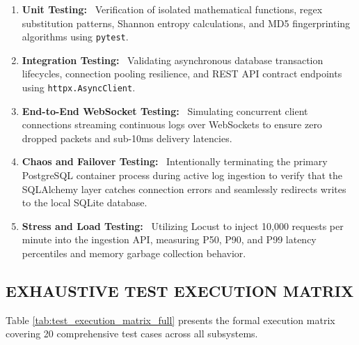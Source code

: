 \documentclass[12pt,a4paper]{article}
\newcommand{\lead}[1]{\textbf{#1}\ }
\begin{document}
\begin{enumerate}[leftmargin=1.5em,itemsep=4pt]
    \item \lead{Unit Testing:} Verification of isolated mathematical functions, regex substitution patterns, Shannon entropy calculations, and MD5 fingerprinting algorithms using \texttt{pytest}.
    \item \lead{Integration Testing:} Validating asynchronous database transaction lifecycles, connection pooling resilience, and REST API contract endpoints using \texttt{httpx.AsyncClient}.
    \item \lead{End-to-End WebSocket Testing:} Simulating concurrent client connections streaming continuous logs over WebSockets to ensure zero dropped packets and sub-10ms delivery latencies.
    \item \lead{Chaos and Failover Testing:} Intentionally terminating the primary PostgreSQL container process during active log ingestion to verify that the SQLAlchemy layer catches connection errors and seamlessly redirects writes to the local SQLite database.
    \item \lead{Stress and Load Testing:} Utilizing Locust to inject 10,000 requests per minute into the ingestion API, measuring P50, P90, and P99 latency percentiles and memory garbage collection behavior.
\end{enumerate}

\subsection{EXHAUSTIVE TEST EXECUTION MATRIX}
Table \ref{tab:test_execution_matrix_full} presents the formal execution matrix covering 20 comprehensive test cases across all subsystems.
\end{document}
